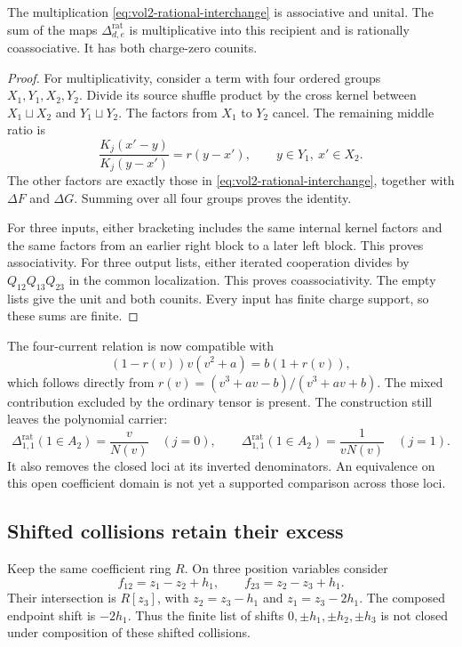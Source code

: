 \begin{proposition}\label{prop:vol2-rational-cooperation}
The multiplication \eqref{eq:vol2-rational-interchange} is
associative and unital.
The sum of the maps $\Delta_{d,e}^{\mathrm{rat}}$ is multiplicative
into this recipient and is rationally coassociative.
It has both charge-zero counits.
\end{proposition}
\begin{proof}
For multiplicativity, consider a term with four ordered groups
$X_1,Y_1,X_2,Y_2$.
Divide its source shuffle product by the cross kernel between
$X_1\sqcup X_2$ and $Y_1\sqcup Y_2$.
The factors from $X_1$ to $Y_2$ cancel.
The remaining middle ratio is
\[
 \frac{K_j(x'-y)}{K_j(y-x')}=r(y-x'),
 \qquad y\in Y_1,\ x'\in X_2.
\]
The other factors are exactly those in
\eqref{eq:vol2-rational-interchange}, together with
$\Delta F$ and $\Delta G$.
Summing over all four groups proves the identity.

For three inputs, either bracketing includes the same internal
kernel factors and the same factors from an earlier right block
to a later left block.
This proves associativity.
For three output lists, either iterated cooperation divides by
$Q_{12}Q_{13}Q_{23}$ in the common localization.
This proves coassociativity.
The empty lists give the unit and both counits.
Every input has finite charge support, so these sums are finite.
\end{proof}

The four-current relation is now compatible with
\[
 (1-r(v))v(v^2+a)=b(1+r(v)),
\]
which follows directly from
$r(v)=(v^3+av-b)/(v^3+av+b)$.
The mixed contribution excluded by the ordinary tensor is present.
The construction still leaves the polynomial carrier:
\[
 \Delta_{1,1}^{\mathrm{rat}}(1\in A_2)
  =\frac{v}{N(v)}\quad(j=0),\qquad
 \Delta_{1,1}^{\mathrm{rat}}(1\in A_2)
  =\frac{1}{vN(v)}\quad(j=1).
\]
It also removes the closed loci at its inverted denominators.
An equivalence on this open coefficient domain is not yet a
supported comparison across those loci.

\subsection{Shifted collisions retain their excess}

Keep the same coefficient ring $R$.
On three position variables consider
\[
 f_{12}=z_1-z_2+h_1,\qquad
 f_{23}=z_2-z_3+h_1.
\]
Their intersection is $R[z_3]$, with
$z_2=z_3-h_1$ and $z_1=z_3-2h_1$.
The composed endpoint shift is $-2h_1$.
Thus the finite list of shifts $0,\pm h_1,\pm h_2,\pm h_3$
is not closed under composition of these shifted collisions.

